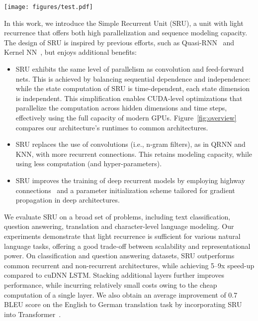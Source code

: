 \documentclass[11pt,a4paper]{article}
\newcommand{\yae}[2]{{#1}{#2}}
\begin{document}
\begin{figure*}[!ht]
\centering
\texttt{[image: figures/test.pdf]}
\vspace{-0.1in}
\caption{Average processing time in milliseconds of a batch of 32 samples using cuDNN LSTM, word-level convolution \texttt{conv2d} (with filter width  and ), and the proposed SRU. We vary the number of tokens per sequence () and feature dimension ().}
\label{fig:overview}
\end{figure*}

In this work, we introduce the Simple Recurrent Unit (SRU), a unit with light recurrence that offers both high parallelization and sequence modeling capacity.
The design of SRU is inspired by previous efforts, \yae{such as Quasi-RNN~\cite[QRNN;][]{bradbury2016quasi} and Kernel NN~\citep[KNN;][]{lei2017deriving}}{}, but enjoys additional benefits:
\begin{itemize}
\item SRU exhibits the same level of parallelism as convolution and feed-forward nets. This is achieved by balancing sequential dependence and independence: while the state computation of SRU is time-dependent, each state dimension is independent. \yae{This simplification enables CUDA-level optimizations that parallelize the computation across hidden dimensions and time steps, effectively using the full capacity of modern GPUs.}{}
\yae{Figure~\ref{fig:overview} compares our architecture's runtimes to common architectures.}{} 
\item \yae{SRU replaces the use of convolutions (i.e., n-gram filters), as in QRNN and KNN, with more recurrent connections}{}.
This retains modeling capacity, while using less computation (and hyper-parameters).
\item SRU improves the training of deep recurrent models by employing highway connections~\citep{srivastava2015training} \yae{and a parameter initialization scheme tailored for gradient propagation}{} in deep architectures.
\end{itemize}


We evaluate SRU on a broad set of problems, including text classification, question answering, translation and character-level language modeling.
Our experiments demonstrate that light recurrence is sufficient for various natural language tasks, offering a good trade-off between scalability and representational power.
On classification and question answering datasets, SRU outperforms common recurrent and non-recurrent architectures, while achieving 5--9x speed-up compared to cuDNN LSTM.
Stacking additional layers further improves performance, while incurring relatively small costs owing to the cheap computation of a single layer. 
We also obtain an average improvement of 0.7 BLEU score on the English to German translation task by incorporating SRU into Transformer~\citep{vaswani2017attention}.
\end{document}

